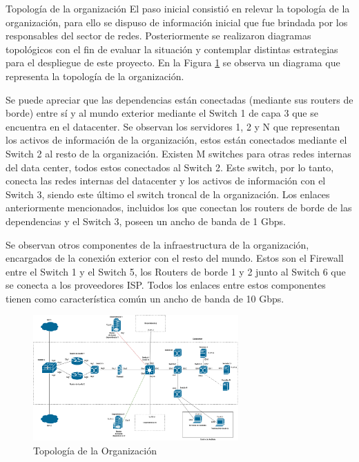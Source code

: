     \begin{section}{Topología de la organización}
        El paso inicial consistió en relevar la topología de la organización, para ello se dispuso de información inicial que fue brindada por los responsables del sector de redes. Posteriormente se realizaron diagramas topológicos con el fin de evaluar la situación y contemplar distintas estrategias para el despliegue de este proyecto.  
        En la Figura \ref{fig:iter1_top_unc} se observa un diagrama que representa la topología de la organización.\par
        Se puede apreciar que las dependencias están conectadas (mediante sus routers de borde) entre sí y al mundo exterior mediante el Switch 1 de capa 3 que se encuentra en el datacenter. Se observan los servidores 1, 2 y N que representan los activos de información de la organización, estos están conectados mediante el Switch 2 al resto de la organización. Existen M switches para otras redes internas del data center, todos estos conectados al Switch 2. Este switch, por lo tanto, conecta las redes internas del datacenter y los activos de información con el Switch 3, siendo este último el switch troncal de la organización. Los enlaces anteriormente mencionados, incluidos los que conectan los routers de borde de las dependencias y el Switch 3, poseen un ancho de banda de 1 Gbps.\par
        Se observan otros componentes de la infraestructura de la organización, encargados de la conexión exterior con el resto del mundo. Estos son el Firewall entre el Switch 1 y el Switch 5, los Routers de borde 1 y 2 junto al Switch 6 que se conecta a los proveedores ISP. Todos los enlaces entre estos componentes tienen como característica común un ancho de banda de 10 Gbps. \par
        \begin{figure}[H]
        \centering
            \includegraphics[width=0.7\textwidth]{./iteracion_1_imagenes/figura_topologia_UNC.png}
            \caption{Topología de la Organización}
            \label{fig:iter1_top_unc}
        \end{figure}
        \FloatBarrier
    \end{section}
